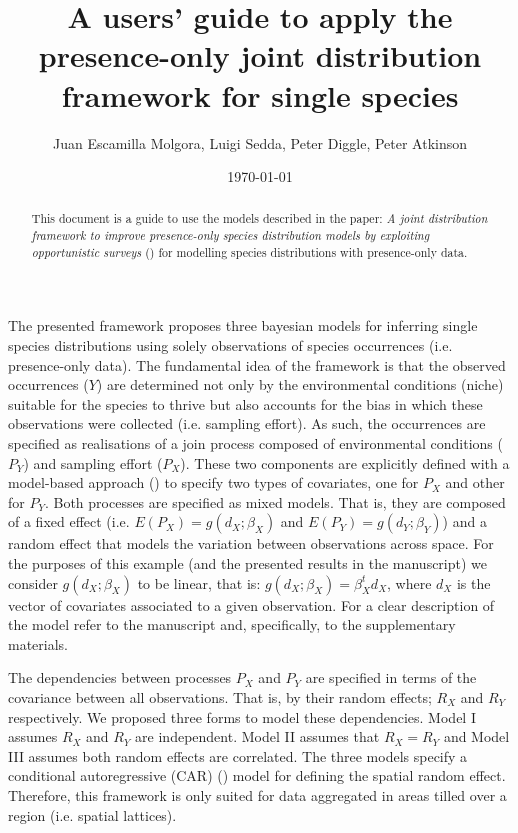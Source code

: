 \documentclass[11pt]{article}
\author{Juan Escamilla Molgora, Luigi Sedda, Peter Diggle, Peter Atkinson}
\date{\today}
\title{A users' guide to apply the presence-only joint distribution framework for single species}
\begin{document}
\maketitle
\begin{abstract}
This document is a guide to use the models described in the paper: \emph{A joint distribution framework to improve presence-only species distribution models by exploiting opportunistic surveys} (\cite{EscamillaMolgora2021}) for modelling species distributions with presence-only data.
\end{abstract}

The presented framework proposes three bayesian models for inferring single species distributions using solely observations of species occurrences (i.e. presence-only data).
The fundamental idea of the framework is that the observed occurrences (\(Y\)) are determined not only by the environmental conditions (niche) suitable for the species to thrive but also accounts for the bias in which these observations were collected (i.e. sampling effort). As such, the occurrences are specified as realisations of a join process composed of environmental conditions (\(P_Y\)) and sampling effort (\(P_X\)). These two components are explicitly defined with a model-based approach (\cite{Diggle2002}) to specify two types of covariates, one for \(P_X\) and other for \(P_Y\).
Both processes are specified as mixed models. That is, they are composed of  a fixed effect (i.e. \(E(P_X) = g(d_X;\beta_X)\) and \(E(P_Y) = g(d_Y;\beta_Y)\)) and a random effect that models the variation between observations across space. For the purposes of this example (and the presented results in the manuscript) we consider \(g(d_X;\beta_X)\) to be linear, that is: \(g(d_X;\beta_X) = \beta_X^t d_X\), where \(d_X\) is the vector of covariates associated to a given observation. For a clear description of the model refer to the manuscript and, specifically, to the supplementary materials.

The dependencies between processes \(P_X\) and \(P_Y\) are specified in terms of the covariance between all observations. That is, by their random effects; \(R_X\) and \(R_Y\) respectively. We proposed three forms to model these dependencies. Model I assumes \(R_X\) and \(R_Y\) are independent. Model II assumes that \(R_X = R_Y\) and Model III assumes both random effects are correlated. The three models specify a conditional autoregressive (CAR) (\cite{Besag1974}) model for defining the spatial random effect. Therefore, this framework is only suited for data aggregated in areas tilled over a region (i.e. spatial lattices).
\end{document}
